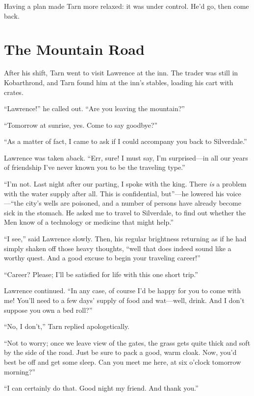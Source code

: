 Having a plan made Tarn more relaxed: it was under control.  He'd go, then come back.

\chapter{The Mountain Road}

After his shift, Tarn went to visit Lawrence at the inn.  The trader was still in Kobarthrond, and Tarn found him at the inn's stables, loading his cart with crates.

``Lawrence!'' he called out.  ``Are you leaving the mountain?''

``Tomorrow at sunrise, yes.  Come to say goodbye?''

``As a matter of fact, I came to ask if I could accompany you back to Silverdale.''

Lawrence was taken aback.  ``Err, sure!  I must say, I'm surprised---in all our years of friendship I've never known you to be the traveling type.''

``I'm not.  Last night after our parting, I spoke with the king.  There \emph{is} a problem with the water supply after all.  This is confidential, but''---he lowered his voice---``the city's wells are poisoned, and a number of persons have already become sick in the stomach.  He asked me to travel to Silverdale, to find out whether the Men know of a technology or medicine that might help.''

``I see,'' said Lawrence slowly.  Then, his regular brightness returning as if he had simply shaken off those heavy thoughts, ``well that does indeed sound like a worthy quest.  And a good excuse to begin your traveling career!''

``Career?  Please; I'll be satisfied for life with this one short trip.''

Lawrence continued.  ``In any case, of course I'd be happy for you to come with me!  You'll need to a few days' supply of food and wat---well, drink.  And I don't suppose you own a bed roll?''

``No, I don't,'' Tarn replied apologetically.

``Not to worry; once we leave view of the gates, the grass gets quite thick and soft by the side of the road.  Just be sure to pack a good, warm cloak.  Now, you'd best be off and get some sleep.  Can you meet me here, at six o'clock tomorrow morning?''

``I can certainly do that.  Good night my friend.  And thank you.''


